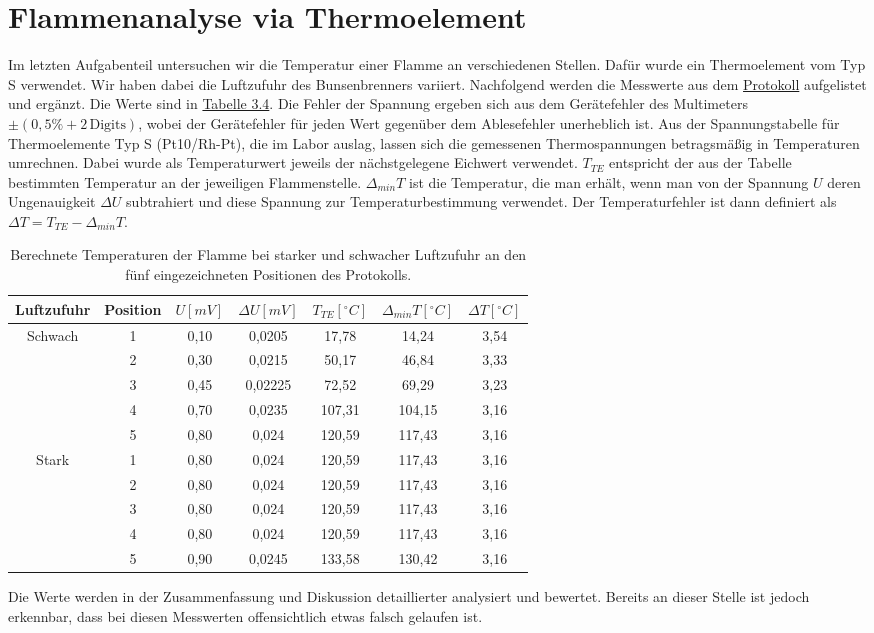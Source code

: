 \section{Flammenanalyse via Thermoelement}
Im letzten Aufgabenteil untersuchen wir die Temperatur einer Flamme an verschiedenen Stellen. Dafür wurde ein Thermoelement vom Typ S verwendet. 
Wir haben dabei die Luftzufuhr des Bunsenbrenners variiert. Nachfolgend werden die Messwerte aus dem \hyperref[Protokoll]{Protokoll} aufgelistet und ergänzt. Die Werte sind in \hyperref[tab:letzte_tabelle_aus_diesem_doofen_versuch_ich_will_wirklcih_nicht_mehr_HILFE]{Tabelle 3.4}.
Die Fehler der Spannung ergeben sich aus dem Gerätefehler des Multimeters $\pm(0,5\% + 2\,\text{Digits})$,
wobei der Gerätefehler für jeden Wert gegenüber dem Ablesefehler unerheblich ist.
Aus der Spannungstabelle für Thermoelemente Typ S (Pt10/Rh-Pt), die im Labor auslag, lassen sich die gemessenen Thermospannungen betragsmäßig in Temperaturen umrechnen. Dabei wurde als Temperaturwert jeweils der nächstgelegene Eichwert verwendet.
$T_{TE}$ entspricht der aus der Tabelle bestimmten Temperatur an der jeweiligen Flammenstelle. $\Delta_{min} T$ ist die Temperatur, die man erhält, wenn man von der Spannung $U$ deren Ungenauigkeit $\Delta U$ subtrahiert und diese Spannung zur Temperaturbestimmung verwendet.
Der Temperaturfehler ist dann definiert als $\Delta T = T_{TE} - \Delta_{min} T$.

\begin{table}[h!]
    \onecolumn
    \centering
    \caption{Berechnete Temperaturen der Flamme bei starker und schwacher Luftzufuhr an den fünf eingezeichneten Positionen des Protokolls.}
    \label{tab:letzte_tabelle_aus_diesem_doofen_versuch_ich_will_wirklcih_nicht_mehr_HILFE}
    \begin{tabular}{c | c | c | c | c | c | c}
        \toprule
        Luftzufuhr & Position & $U [mV]$ & $\Delta U [mV]$ & $T_{TE} [^\circ C]$ & $\Delta_{min} T [^\circ C]$ & $\Delta T [^\circ C]$ \\
        \midrule
        Schwach & 1 & 0,10 & 0,0205 & 17,78 & 14,24 & 3,54\\
                & 2 & 0,30 & 0,0215 & 50,17 & 46,84 & 3,33 \\
                & 3 & 0,45 & 0,02225 & 72,52 & 69,29 & 3,23\\
                & 4 & 0,70 & 0,0235 & 107,31 & 104,15 & 3,16 \\
                & 5 & 0,80 & 0,024 & 120,59 & 117,43 & 3,16 \\
        \hline
        Stark   & 1 & 0,80 & 0,024 & 120,59 & 117,43 & 3,16 \\
                & 2 & 0,80 & 0,024 & 120,59 & 117,43 & 3,16 \\
                & 3 & 0,80 & 0,024 & 120,59 & 117,43 & 3,16 \\
                & 4 & 0,80 & 0,024 & 120,59 & 117,43 & 3,16 \\
                & 5 & 0,90 & 0,0245 & 133,58 & 130,42 & 3,16 \\
        \bottomrule
    \end{tabular}
    \twocolumn
\end{table}

Die Werte werden in der Zusammenfassung und Diskussion detaillierter analysiert und bewertet. Bereits an dieser Stelle ist jedoch erkennbar, dass bei diesen Messwerten offensichtlich etwas falsch gelaufen ist.

